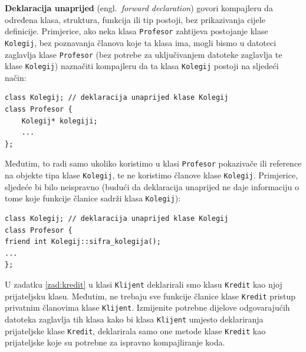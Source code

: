 \textbf{Deklaracija unaprijed} (engl.\ \textit{forward declaration}) 
govori kompajleru da određena klasa, struktura, funkcija ili tip postoji, bez prikazivanja cijele definicije.
Primjerice,
ako neka klasa \texttt{Profesor} zahtijeva postojanje klase \texttt{Kolegij},
bez poznavanja članova koje ta klasa ima,
mogli bismo u datoteci zaglavlja klase \texttt{Profesor} (bez potrebe za uključivanjem datoteke zaglavlja te klase \texttt{Kolegij})
naznačiti kompajleru da ta klasa \texttt{Kolegij} postoji na sljedeći način:
\begin{verbatim}
class Kolegij; // deklaracija unaprijed klase Kolegij
class Profesor {
    Kolegij* kolegiji;
    ...
};
\end{verbatim}
Međutim, to radi samo ukoliko koristimo u klasi \texttt{Profesor}
pokazivače ili reference na objekte tipa klase \texttt{Kolegij},
te ne koristimo članove klase \texttt{Kolegij}.
Primjerice, sljedeće bi bilo neispravno
(budući da deklaracija unaprijed ne daje informaciju o tome koje funkcije članice sadrži klasa \texttt{Kolegij}):
\begin{verbatim}
class Kolegij; // deklaracija unaprijed klase Kolegij
class Profesor {
friend int Kolegij::sifra_kolegija();
...
};
\end{verbatim}


\begin{zadatak}
    U zadatku \ref{zad:kredit} u klasi \texttt{Klijent}
    deklarirali smo klasu \texttt{Kredit} kao njoj prijateljsku klasu.
    Međutim, ne trebaju sve funkcije članice klase \texttt{Kredit}
    pristup privatnim članovima klase \texttt{Klijent}.
    Izmijenite potrebne dijelove odgovarajućih datoteka zaglavlja tih klasa
    kako bi klasa \texttt{Klijent} umjesto deklariranja
    prijateljske klase \texttt{Kredit},
    deklarirala samo one metode klase \texttt{Kredit}
    kao prijateljske koje su potrebne za ispravno kompajliranje koda.
\end{zadatak}


